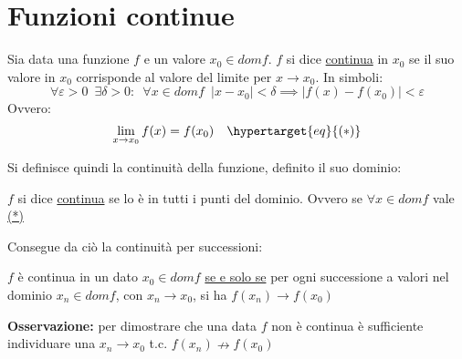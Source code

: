 \documentclass[10pt, oneside]{book}
\theoremstyle{plain}
\begin{document}
\section{Funzioni continue}
\begin{defin}
Sia data una funzione $f$ e un valore $x_0 \in dom f$. $f$ si dice \underline{continua} in $x_0$ se il suo valore in $x_0$ corrisponde al valore del limite per $x \rightarrow x_0$. In simboli:
\[\forall \varepsilon >0 \enspace \exists \delta > 0 : \enspace \forall x \in domf \enspace |x-x_0| < \delta \implies |f(x)-f(x_0)| < \varepsilon\]
Ovvero:
\[\lim \limits_{x \rightarrow x_0} f(x) = f(x_0) \quad {\hypertarget{eq}{(*)}}\]
\end{defin}
Si definisce quindi la continuità della funzione, definito il suo dominio:
\begin{defin}
$f$ si dice \underline{continua} se lo è in tutti i punti del dominio. Ovvero se $\forall x \in domf$ vale \hyperlink{eq}{(*)}
\end{defin}
Consegue da ciò la continuità per successioni:
\begin{ther}
$f$ è continua in un dato $x_0 \in domf$ \underline{se e solo se} per ogni successione a valori nel dominio $x_n \in domf$, con $x_n \longrightarrow x_0$, si ha $f(x_n) \longrightarrow f(x_0)$
\end{ther}
\begin{center}
\end{center}
\textbf{Osservazione: } per dimostrare che una data $f$ non è continua è sufficiente individuare una $x_n \longrightarrow x_0$ t.c. $f(x_n) \nrightarrow f(x_0)$
\end{document}
